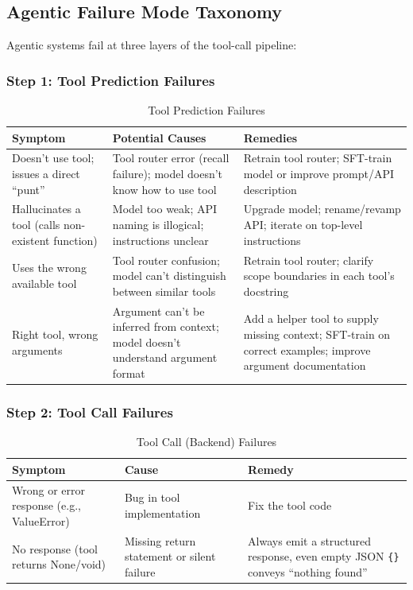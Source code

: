 \documentclass[11pt, a4paper]{article}
\begin{document}
\subsection{Agentic Failure Mode Taxonomy}

Agentic systems fail at three layers of the tool-call pipeline:

\subsubsection{Step 1: Tool Prediction Failures}

\begin{table}[h]
\centering
\caption{Tool Prediction Failures}
\begin{tabular}{@{}p{3cm}p{4.5cm}p{5cm}@{}}
\toprule
\textbf{Symptom} & \textbf{Potential Causes} & \textbf{Remedies} \\
\midrule
Doesn't use tool; issues a direct ``punt'' & Tool router error (recall failure); model doesn't know how to use tool & Retrain tool router; SFT-train model or improve prompt/API description \\
\addlinespace
Hallucinates a tool (calls non-existent function) & Model too weak; API naming is illogical; instructions unclear & Upgrade model; rename/revamp API; iterate on top-level instructions \\
\addlinespace
Uses the wrong available tool & Tool router confusion; model can't distinguish between similar tools & Retrain tool router; clarify scope boundaries in each tool's docstring \\
\addlinespace
Right tool, wrong arguments & Argument can't be inferred from context; model doesn't understand argument format & Add a helper tool to supply missing context; SFT-train on correct examples; improve argument documentation \\
\bottomrule
\end{tabular}
\end{table}

\subsubsection{Step 2: Tool Call Failures}

\begin{table}[h]
\centering
\caption{Tool Call (Backend) Failures}
\begin{tabular}{@{}p{3cm}p{4.5cm}p{5cm}@{}}
\toprule
\textbf{Symptom} & \textbf{Cause} & \textbf{Remedy} \\
\midrule
Wrong or error response (e.g., ValueError) & Bug in tool implementation & Fix the tool code \\
\addlinespace
No response (tool returns None/void) & Missing return statement or silent failure & Always emit a structured response, even empty JSON \texttt{\{\}} conveys ``nothing found'' \\
\bottomrule
\end{tabular}
\end{table}
\end{document}
